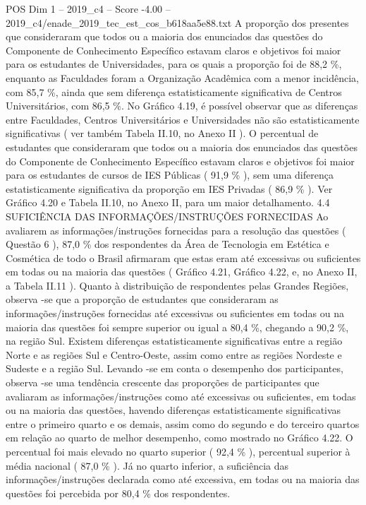 \begin{textsample}{POS Dim 1 – 2019\_c4 – Score -4.00 – 2019\_c4/enade\_2019\_tec\_est\_cos\_b618aa5e88.txt}
A proporção dos presentes que consideraram que todos ou a maioria dos enunciados das questões do Componente de Conhecimento Específico estavam claros e objetivos foi maior para os estudantes de Universidades, para os quais a proporção foi de 88,2 \%, enquanto as Faculdades foram a Organização Acadêmica com a menor incidência, com 85,7 \%, ainda que sem diferença estatisticamente significativa de Centros Universitários, com 86,5 \%.
No Gráfico 4.19, é possível observar que as diferenças entre Faculdades, Centros Universitários e Universidades não são estatisticamente significativas ( ver também Tabela II.10, no Anexo II ).
O percentual de estudantes que consideraram que todos ou a maioria dos enunciados das questões do Componente de Conhecimento Específico estavam claros e objetivos foi maior para os estudantes de cursos de IES Públicas ( 91,9 \% ), sem uma diferença estatisticamente significativa da proporção em IES Privadas ( 86,9 \% ).
Ver Gráfico 4.20 e Tabela II.10, no Anexo II, para um maior detalhamento. 4.4 SUFICIÊNCIA DAS INFORMAÇÕES/INSTRUÇÕES FORNECIDAS Ao avaliarem as informações/instruções fornecidas para a resolução das questões ( Questão 6 ), 87,0 \% dos respondentes da Área de Tecnologia em Estética e Cosmética de todo o Brasil afirmaram que estas eram até excessivas ou suficientes em todas ou na maioria das questões ( Gráfico 4.21, Gráfico 4.22, e, no Anexo II, a Tabela II.11 ).
Quanto à distribuição de respondentes pelas Grandes Regiões, observa -se que a proporção de estudantes que consideraram as informações/instruções fornecidas até excessivas ou suficientes em todas ou na maioria das questões foi sempre superior ou igual a 80,4 \%, chegando a 90,2 \%, na região Sul.
Existem diferenças estatisticamente significativas entre a região Norte e as regiões Sul e Centro-Oeste, assim como entre as regiões Nordeste e Sudeste e a região Sul.
Levando -se em conta o desempenho dos participantes, observa -se uma tendência crescente das proporções de participantes que avaliaram as informações/instruções como até excessivas ou suficientes, em todas ou na maioria das questões, havendo diferenças estatisticamente significativas entre o primeiro quarto e os demais, assim como do segundo e do terceiro quartos em relação ao quarto de melhor desempenho, como mostrado no Gráfico 4.22.
O percentual foi mais elevado no quarto superior ( 92,4 \% ), percentual superior à média nacional ( 87,0 \% ).
Já no quarto inferior, a suficiência das informações/instruções declarada como até excessiva, em todas ou na maioria das questões foi percebida por 80,4 \% dos respondentes.

\end{textsample}
